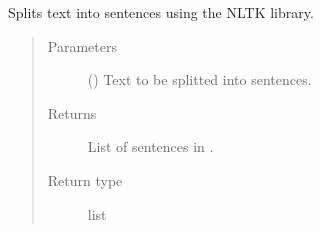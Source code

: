 \documentclass[letterpaper,10pt,english]{sphinxmanual}
\begin{document}
\begin{fulllineitems}
\label{\detokenize{code:code_utils.utils.split_text_into_sentences_nltk}}
Splits text into sentences using the NLTK library.
\begin{quote}\begin{description}
\item[{Parameters}] \leavevmode
{} () \textendash{} Text to be splitted into sentences.

\item[{Returns}] \leavevmode
List of sentences in .

\item[{Return type}] \leavevmode
list

\end{description}\end{quote}

\end{fulllineitems}

\end{document}
